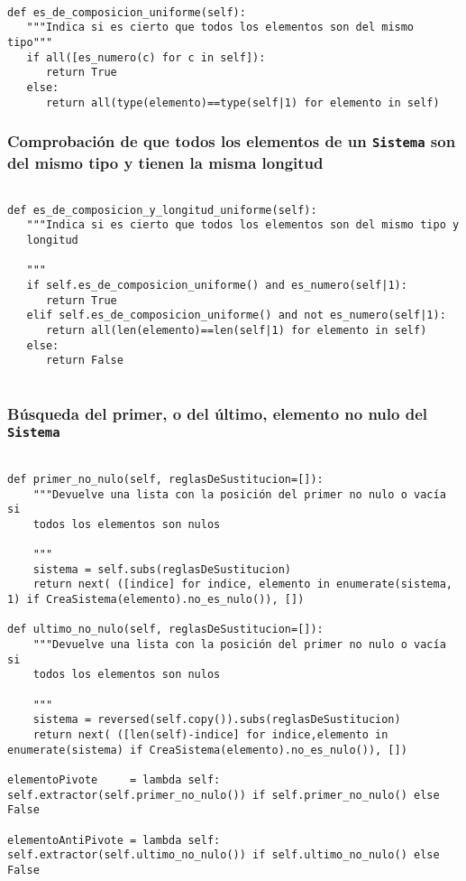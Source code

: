 \documentclass[11pt]{report}
\begin{document}
\begin{verbatim}

def es_de_composicion_uniforme(self):
   """Indica si es cierto que todos los elementos son del mismo tipo"""
   if all([es_numero(c) for c in self]):
      return True
   else:
      return all(type(elemento)==type(self|1) for elemento in self)

\end{verbatim}

\subsubsection{Comprobación de que todos los elementos de un \texttt{Sistema} son del mismo tipo y tienen la misma longitud}
\label{sec:orgf209bd8}

\begin{verbatim}

def es_de_composicion_y_longitud_uniforme(self):
   """Indica si es cierto que todos los elementos son del mismo tipo y
   longitud

   """
   if self.es_de_composicion_uniforme() and es_numero(self|1):
      return True
   elif self.es_de_composicion_uniforme() and not es_numero(self|1):
      return all(len(elemento)==len(self|1) for elemento in self)
   else:
      return False
   
\end{verbatim}

\subsubsection{Búsqueda del primer, o del último, elemento no nulo del \texttt{Sistema}}
\label{sec:orge1963c3}

\begin{verbatim}

def primer_no_nulo(self, reglasDeSustitucion=[]):
    """Devuelve una lista con la posición del primer no nulo o vacía si
    todos los elementos son nulos

    """
    sistema = self.subs(reglasDeSustitucion)
    return next( ([indice] for indice, elemento in enumerate(sistema, 1) if CreaSistema(elemento).no_es_nulo()), [])

def ultimo_no_nulo(self, reglasDeSustitucion=[]):
    """Devuelve una lista con la posición del primer no nulo o vacía si
    todos los elementos son nulos

    """
    sistema = reversed(self.copy()).subs(reglasDeSustitucion)
    return next( ([len(self)-indice] for indice,elemento in enumerate(sistema) if CreaSistema(elemento).no_es_nulo()), [])

elementoPivote     = lambda self:  self.extractor(self.primer_no_nulo()) if self.primer_no_nulo() else False

elementoAntiPivote = lambda self:  self.extractor(self.ultimo_no_nulo()) if self.ultimo_no_nulo() else False

\end{verbatim}
\end{document}
